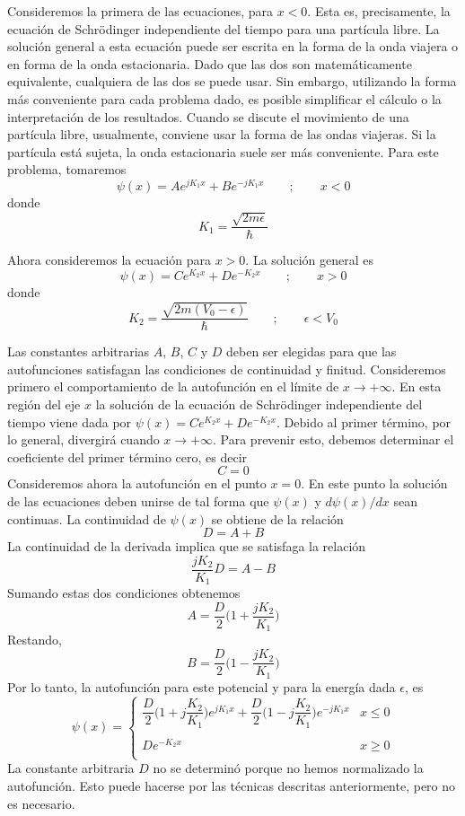 \documentclass[12pt,a4paper]{article}
\def\e{{\epsilon}} %
\begin{document}
Consideremos la primera de las ecuaciones, para $x<0$. Esta es, precisamente, la ecuación de Schrödinger independiente del tiempo para una partícula libre. La solución general a esta ecuación puede ser escrita en la forma de la onda viajera o en forma de la onda estacionaria. Dado que las dos son matemáticamente equivalente, cualquiera de las dos se puede usar. Sin embargo, utilizando la forma más conveniente para cada problema dado, es posible simplificar el cálculo o la interpretación de los resultados. Cuando se discute el movimiento de una partícula libre, usualmente, conviene usar la forma de las ondas viajeras. Si la partícula está sujeta, la onda estacionaria suele ser más conveniente. Para este problema, tomaremos
\[ \psi (x)=Ae^{jK_{1}x}+Be^{-jK_{1}x} \qquad ; \qquad x < 0 \]
donde
\[ K_{1}=\frac{\sqrt{2m\e}}{\hbar} \]

Ahora consideremos la ecuación para $x>0$. La solución general es
\[ \psi (x)=Ce^{K_{2}x}+De^{-K_{2}x} \qquad ; \qquad x > 0 \]
donde
\[ K_{2}=\frac{\sqrt{2m(V_{0}-\e)}}{\hbar} \qquad ; \qquad \e<V_{0} \]

Las constantes arbitrarias $A$, $B$, $C$ y $D$ deben ser elegidas para que las autofunciones satisfagan las condiciones de continuidad y finitud. Consideremos primero el comportamiento de la autofunción en el límite de $x\rightarrow +\infty$. En esta región del eje $x$ la solución de la ecuación de Schrödinger independiente del tiempo viene dada por $\psi (x)=Ce^{K_{2}x}+De^{-K_{2}x}$. Debido al primer término, por lo general, divergirá cuando $x\rightarrow +\infty$. Para prevenir esto, debemos determinar el coeficiente del primer término cero, es decir
\[ C=0 \]
Consideremos ahora la autofunción en el punto $x=0$. En este punto la solución de las ecuaciones deben unirse de tal forma que $\psi(x)$ y $d\psi(x)/dx$ sean continuas. La continuidad de $\psi(x)$ se obtiene de la relación
\[ D=A+B \]
La continuidad de la derivada implica que se satisfaga la relación
\[ \frac{jK_{2}}{K_{1}}D=A-B \]
Sumando estas dos condiciones obtenemos
\[ A=\frac{D}{2} \bigg( 1+\frac{jK_{2}}{K_{1}} \bigg) \]
Restando,
\[ B=\frac{D}{2} \bigg( 1-\frac{jK_{2}}{K_{1}} \bigg) \]
Por lo tanto, la autofunción para este potencial y para la energía dada $\e$, es
\[
\psi(x)=
\left\{
\begin{array}{ll}
\dfrac{D}{2}\bigg( 1+j\dfrac{K_{2}}{K_{1}} \bigg)e^{jK_{1}x}+\dfrac{D}{2}\bigg( 1-j\dfrac{K_{2}}{K_{1}} \bigg)e^{-jK_{1}x} & x \leq 0 \\
 & \\
De^{-K_{2}x} & x \geq 0 \\
\end{array}
\right.
\]
La constante arbitraria $D$ no se determinó porque no hemos normalizado la autofunción. Esto puede hacerse por las técnicas descritas anteriormente, pero no es necesario.
\end{document}
